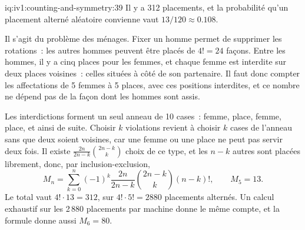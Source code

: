 \begin{solution}{iq:iv1:counting-and-symmetry:39}
Il y a 312 placements, et la probabilité qu'un placement alterné aléatoire convienne vaut $13/120 \approx 0.108$.

Il s'agit du problème des ménages. Fixer un homme permet de supprimer les rotations~: les autres hommes peuvent être placés de $4! = 24$ façons. Entre les hommes, il y a cinq places pour les femmes, et chaque femme est interdite sur deux places voisines~: celles situées à côté de son partenaire. Il faut donc compter les affectations de 5 femmes à 5 places, avec ces positions interdites, et ce nombre ne dépend pas de la façon dont les hommes sont assis.

Les interdictions forment un seul anneau de 10 cases~: femme, place, femme, place, et ainsi de suite. Choisir $k$ violations revient à choisir $k$ cases de l'anneau sans que deux soient voisines, car une femme ou une place ne peut pas servir deux fois. Il existe $\frac{2n}{2n - k}\binom{2n - k}{k}$ choix de ce type, et les $n - k$ autres sont placées librement, donc, par inclusion-exclusion,
\[
M_n = \sum_{k=0}^{n} (-1)^k \frac{2n}{2n - k}\binom{2n - k}{k} (n - k)!, \qquad M_5 = 13.
\]
Le total vaut $4! \cdot 13 = 312$, sur $4! \cdot 5! = 2880$ placements alternés. Un calcul exhaustif sur les 2\,880 placements par machine donne le même compte, et la formule donne aussi $M_6 = 80$.

\end{solution}

